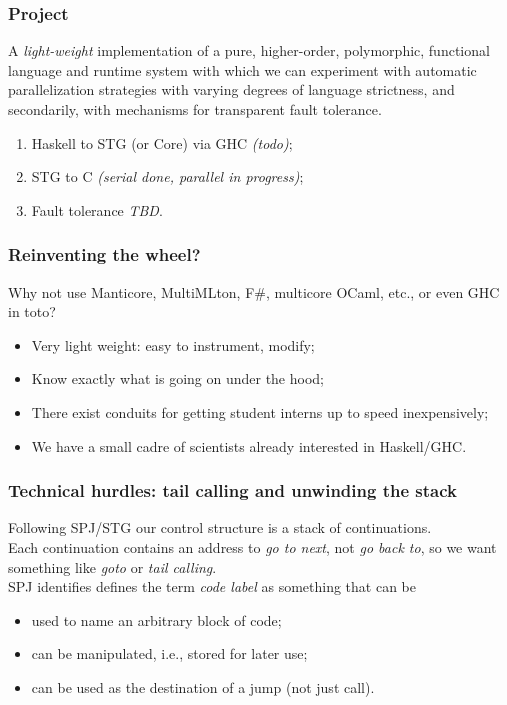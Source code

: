 \documentclass{beamer}
\begin{document}
\begin{frame}
\frametitle{Project} 
A \emph{light-weight} implementation of a pure, higher-order, polymorphic,
functional language and runtime system with which we can experiment with
automatic parallelization strategies with varying degrees of language
strictness, and secondarily, with mechanisms for transparent fault tolerance.
\begin{enumerate}
\item Haskell to STG (or Core) via GHC \emph{(todo)};
\item STG to C \emph{(serial done, parallel in progress)};
\item Fault tolerance \emph{TBD}.
\end{enumerate}
\end{frame}


\begin{frame}
\frametitle{Reinventing the wheel?}  Why not use Manticore, MultiMLton, F\#,
multicore OCaml, etc., or even GHC in toto?
\begin{itemize}
  \item Very light weight:  easy to instrument, modify;
  \item Know exactly what is going on under the hood;
  \item There exist conduits for getting student interns up to speed inexpensively;
  \item We have a small cadre of scientists already interested in Haskell/GHC.
\end{itemize}
\end{frame}


\begin{frame}
\frametitle{Technical hurdles:  tail calling and unwinding the stack}
Following SPJ/STG our control structure is a stack of continuations.  
\\\vspace{0.1in}
Each continuation contains an address to \emph{go to next}, not \emph{go back
  to}, so we want something like \emph{goto} or \emph{tail calling}.
\\\vspace{0.1in}
SPJ identifies defines the term \emph{code label} as something that can be
\begin{itemize}
  \item used to name an arbitrary block of code;
  \item can be manipulated, i.e., stored for later use;
  \item can be used as the destination of a jump (not just call).
\end{itemize}
\end{frame}
\end{document}
